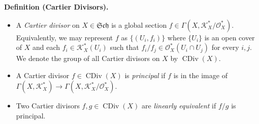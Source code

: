 \documentclass[11pt,a4paper,footinclude=true,headinclude=true]{scrbook} %
\DeclareMathOperator{\CDiv}{CDiv}
\newcommand{\KK}{\mathscr{K}}
\newcommand{\OO}{\mathcal{O}}
\newcommand{\Sch}{\mathfrak{Sch}}
\newcommand{\<}{\langle}
\newcommand{\>}{\rangle}
\newenvironment{definition}[2][Definition]
    { \begin{mdframed}[backgroundcolor=gray!20] \textbf{#1 #2.}\ }
    {  \end{mdframed}}
\begin{document}
\begin{definition}{(Cartier Divisors)}
    \begin{itemize}
        \item A \textit{Cartier divisor} on $X\in\Sch$ is a global section $f\in\Gamma(X,\KK_X^\ast/\OO_X^\ast)$. Equivalently, we may represent $f$ as $\{(U_i,f_i)\}$ where $\{U_i\}$ is an open cover of $X$ and each $f_i\in\KK_X^\ast(U_i)$ such that $f_i/f_j\in\OO_X^\ast(U_i\cap U_j)$ for every $i,j$. We denote the group of all Cartier divisors on $X$ by $\CDiv(X)$.
        \item A Cartier divisor $f\in\CDiv(X)$ is \textit{principal} if $f$ is in the image of $\Gamma(X,\KK_X^\ast)\to\Gamma(X,\KK_X^\ast/\OO_X^\ast)$.
        \item Two Cartier divisors $f,g\in\CDiv(X)$ are \textit{linearly equivalent} if $f/g$ is principal.
    \end{itemize}
\end{definition}
\end{document}
